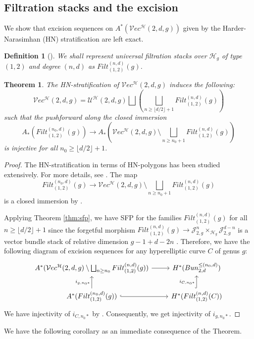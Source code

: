 \documentclass[11pt]{amsart}
\newtheorem{theorem}{Theorem}[section]
\newtheorem{definition}{Definition}[subsection]
\theoremstyle{definition}
\newcommand{\ri}{\rightarrow}
\newcommand{\J}{\mathscr{J}}
\newcommand{\h}{\mathcal{H}}
\newcommand{\U}{\mathscr{U}}
\newcommand{\ve}{\mathcal{V}ec}
\newcommand{\ext}{Filt}
\begin{document}
\subsection{Filtration stacks and the excision}
We show that excision sequences on $A^*(\ve^\h(2,d,g))$ given by the Harder-Narasimhan (HN) stratification are left exact.
\begin{definition}[\cite{prada,shubham-r2-ss}]
We shall represent universal filtration stacks over $\h_g$ of type $(1,2)$ and degree $(n,d)$ as $\ext_{(1,2)}^{(n,d)}(g)$.
\end{definition}
\begin{theorem}\label{thm:excision}
	The HN-stratification of $\ve^\h(2,d,g)$ induces the following:
	$$\ve^\h(2,d,g) = \U^\h(2,d,g)\bigsqcup\left (\bigsqcup_{n\geq \lfloor d/2\rfloor +1}\ext_{(1,2)}^{(n,d)}(g) \right )$$
	such that the pushforward along the closed immersion
	$$A_*(\ext_{(1,2)}^{(n_0,d)}(g))\ri A_*\left(\ve^\h(2,d,g)\setminus \bigsqcup_{n\geq n_0+1}\ext_{(1,2)}^{(n,d)}(g)\right)$$
is injective for all $n_0\geq \lfloor d/2\rfloor +1$.
\end{theorem}
\begin{proof}
	The HN-stratification in terms of HN-polygons has been studied extensively. For more details, see \cite[\S 5]{MR3013029}.
The map 
$$\ext_{(1,2)}^{(n_0,d)}(g)\ri  \ve^\h(2,d,g)\setminus \bigsqcup_{n\geq n_0+1}\ext_{(1,2)}^{(n,d)}(g)$$ is a closed immersion by \cite[Remark 5.2]{MR3013029}.

Applying Theorem \ref{thm:sfp}, we have SFP for the families $\ext_{(1,2)}^{(n,d)}(g)$ for all $n\geq \lfloor d/2\rfloor +1$ since the forgetful morphism $\ext_{(1,2)}^{(n,d)}(g) \ri \J^n_{2,g}\times_{\h_g}\J^{d-n}_{2,g}$ is a vector bundle stack of relative dimension $g-1+d-2n$ \cite[Corollary 3.2]{prada}.
Therefore, we have the following diagram of excision sequences for any hyperelliptic curve $C$ of genus $g$:
$$\begin{tikzcd}
	A^*(\ve^\h(2,d,g)\setminus \bigsqcup_{n\geq n_0}\ext_{(1,2)}^{(n,d)}(g))\ar[r]&H^*(Bun_{2,d}^{\leq (n_0,d)})\\
	A^*(\ext_{(1,2)}^{(n_0,d)}(g))\ar[r,,hook]\ar[u,"i_{g,n_0 *}"]&H^*(\ext_{(1,2)}^{(n,d)}(C))\ar[u,"i_{C,n_0*}",hook]
\end{tikzcd}$$
We have injectivity of $i_{C,n_0*}$ by \cite[Corollary 5.14]{MR3013029}. 
Consequently, we get injectivity of $i_{g,n_0*}$.
\end{proof}
We have the following corollary as an immediate consequence of the Theorem.
\end{document}
